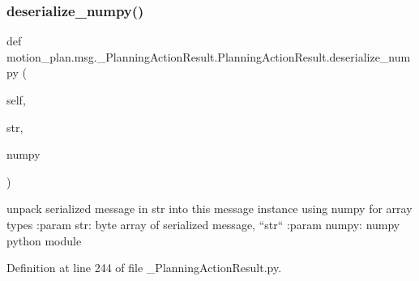 \mbox{\label{classmotion__plan_1_1msg_1_1__PlanningActionResult_1_1PlanningActionResult_a57bde937efbdc7d977dcf98e3da1c3c6}} 
\subsubsection{\texorpdfstring{deserialize\+\_\+numpy()}{deserialize\_numpy()}}
{\footnotesize\ttfamily def motion\+\_\+plan.\+msg.\+\_\+\+Planning\+Action\+Result.\+Planning\+Action\+Result.\+deserialize\+\_\+numpy (\begin{DoxyParamCaption}\item[{}]{self,  }\item[{}]{str,  }\item[{}]{numpy }\end{DoxyParamCaption})}

\begin{DoxyVerb}unpack serialized message in str into this message instance using numpy for array types
:param str: byte array of serialized message, ``str``
:param numpy: numpy python module
\end{DoxyVerb}
 

Definition at line 244 of file \+\_\+\+Planning\+Action\+Result.\+py.


